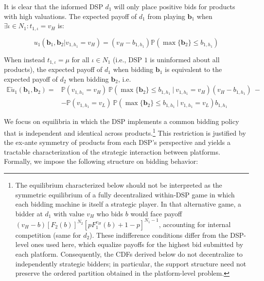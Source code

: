 \noindent It is clear that the informed DSP $ d_1 $ will only place positive bids for products with high valuations. The expected payoff of $ d_1 $ from playing $ \bm{b}_1 $ when $\exists \iota \in N_1 : t_{1,\iota} = v_H $ is:

\begin{equation*}
    u_1(\bm{b}_1, \bm{b}_2 | v_{1,h_1} = v_H) = \left( v_H - b_{1,h_1} \right) \mathbb{P}\left( \max\{ \bm{b}_2 \} \leq b_{1,h_1} \right)
\end{equation*}

\noindent When instead $t_{1,\iota} = \mu$ for all $\iota \in N_1$ (i.e., DSP $1$ is uninformed about all products), the expected payoff of $ d_1 $ when bidding $ \bm{b}_1 $ is equivalent to the expected payoff of $d_2$ when bidding $ \bm{b}_2$, i.e.
\begin{align*}
\mathbb{E} \tilde{u}_1 (\bm{b}_1, \bm{b}_2) = & \mathbb{P}(v_{1,h_1} = v_H) \ \mathbb{P}(\max \{ \bm{b}_2 \} \leq b_{1, h_1} \ | \ v_{1,h_1} = v_H) (v_H - b_{1, h_1}) \ - \\[5pt]
&- \mathbb{P}(v_{1,h_1} = v_L) \ \mathbb{P}(\max \{ \bm{b}_2 \} \leq b_{1, h_1} \ | \ v_{1,h_1} = v_L) b_{1, h_1}
\end{align*}

\noindent We focus on equilibria in which the DSP implements a common bidding policy that is independent and identical across products.\footnote{The equilibrium characterized below should not be interpreted as the symmetric equilibrium of a fully decentralized within-DSP game in which each bidding machine is itself a strategic player. In that alternative game, a bidder at $d_1$ with value $v_H$ who bids $b$ would face payoff $(v_H-b)[F_2(b)]^{N_2}[pF_1^{v_H}(b)+1-p]^{N_1-1}$, accounting for internal competition (same for $d_2$). These indifference conditions differ from the DSP-level ones used here, which equalize payoffs for the highest bid submitted by each platform. Consequently, the CDFs derived below do not decentralize to independently strategic bidders; in particular, the support structure need not preserve the ordered partition obtained in the platform-level problem.} This restriction is justified by the ex-ante symmetry of products from each DSP's perspective and yields a tractable characterization of the strategic interaction between platforms. Formally, we impose the following structure on bidding behavior:

